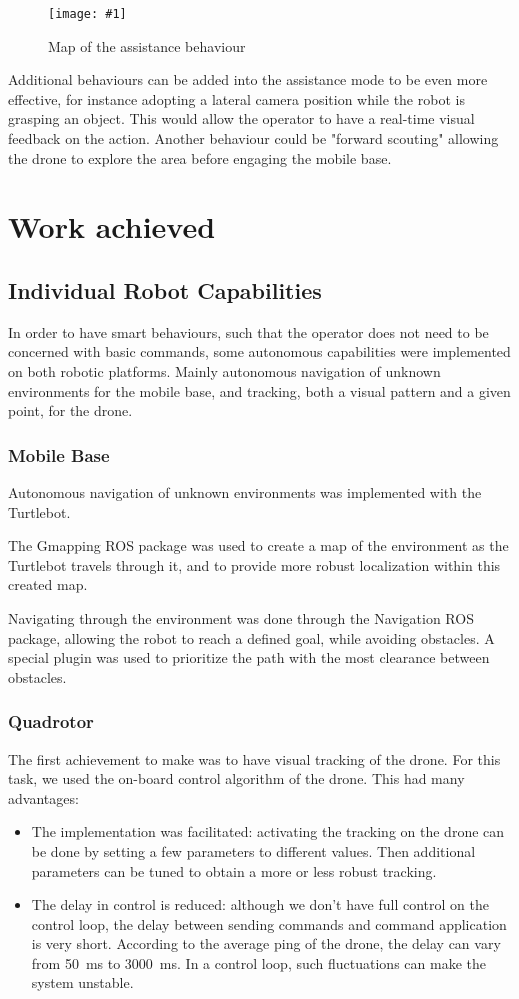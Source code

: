\documentclass[11pt,a4paper]{article}
\newcommand{\centerFigure}[2]{
\begin{figure}[h]	
\centering
\texttt{[image: \#1]}
\caption{#2}
\end{figure}
}
\begin{document}
\centerFigure{assistanceBehavior.png}{Map of the assistance behaviour}

Additional behaviours can be added into the assistance mode to be even more effective, for
instance adopting a lateral camera position while the robot is grasping an object. This would
allow the operator to have a real-time visual feedback on the action. Another behaviour
could be "forward scouting" allowing the drone to explore the area before engaging the 
mobile base.

\section{Work achieved}

\subsection{Individual Robot Capabilities}
In order to have smart behaviours, such that the operator does not need to be concerned with basic commands, some autonomous capabilities were implemented on both robotic platforms. Mainly autonomous navigation of unknown environments for the mobile base, and tracking, both a visual pattern and a given point, for the drone.

\subsubsection{Mobile Base}
Autonomous navigation of unknown environments was implemented with the Turtlebot.

The Gmapping ROS package was used to create a map of the environment as the Turtlebot travels through it, and to provide more robust localization within this created map. 

Navigating through the environment was done through the Navigation ROS package, allowing the robot to reach a defined goal, while avoiding obstacles. A special plugin was used to prioritize the path with the most clearance between obstacles. 



\subsubsection{Quadrotor}
The first achievement to make was to have visual tracking of the drone. For this task, we used 
the on-board control algorithm of the drone. This had many advantages: 
\begin{itemize}
\item The implementation was facilitated: activating the tracking on the drone can be done by 
setting a few parameters to different values. Then additional parameters can be tuned to
obtain a more or less robust tracking.

\item The delay in control is reduced: although we don't have full control on the control
loop, the delay between sending commands and command application is very short. According to
the average ping of the drone, the delay can vary from 50~ms to 3000~ms. In a control loop,
such fluctuations can make the system unstable.
\end{itemize}
\end{document}
